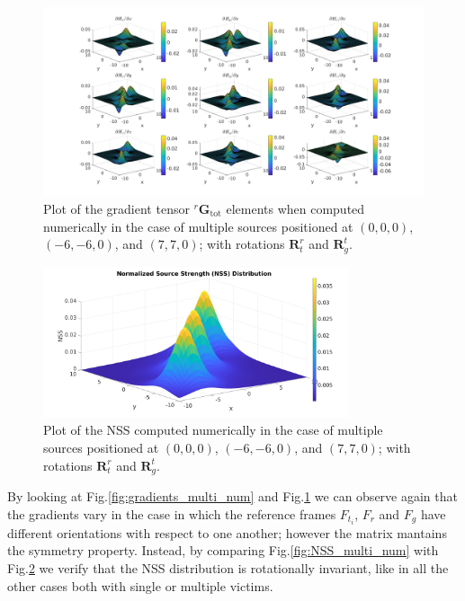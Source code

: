 \begin{figure}
\hspace*{-0.2\textwidth}
\includegraphics[width=1.4\textwidth]{images/gradients_rotated_multi_num.jpg}
\caption{Plot of the gradient tensor ${}^r \mathbf{G}_{\text{tot}}$ elements
when computed numerically in the case of multiple sources positioned at  $(0,0,0)$, $(-6,-6,0)$, and $(7,7,0)$;
with rotations $\mathbf{R}^r_t$ and $\mathbf{R}_g^t$.}
\label{fig:gradients_rotated_multi_num}
\end{figure}

\begin{figure}
\centering
\includegraphics[width=0.8\textwidth]{images/NSS_rotated_multi_num.jpg}
\caption{Plot of the NSS computed numerically in the case of multiple sources positioned at  $(0,0,0)$, $(-6,-6,0)$, and $(7,7,0)$;
with rotations $\mathbf{R}^r_t$ and $\mathbf{R}_g^t$.}
\label{fig:NSS_rotated_multi_num}
\end{figure} 

By looking at Fig.\ref{fig:gradients_multi_num} and Fig.\ref{fig:gradients_rotated_multi_num}
we can observe again that the gradients vary in the case in which the reference
frames $F_{t_i}$, $F_r$ and $F_g$ have different orientations with respect to one another;
however the matrix mantains the symmetry property.
Instead, by comparing Fig.\ref{fig:NSS_multi_num} with Fig.\ref{fig:NSS_rotated_multi_num}
we verify that the NSS distribution is rotationally invariant, like in all the other cases both with 
single or multiple victims.


